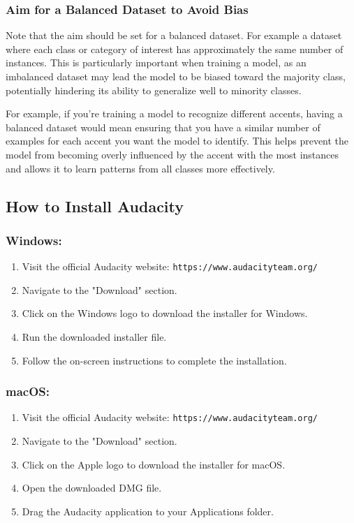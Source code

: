\subsubsection{Aim for a Balanced Dataset to Avoid Bias}

Note that the aim should be set for a balanced dataset. For example a dataset where each class or category of interest has approximately the same number of instances. This is particularly important when training a model, as an imbalanced dataset may lead the model to be biased toward the majority class, potentially hindering its ability to generalize well to minority classes.

For example, if you're training a model to recognize different accents, having a balanced dataset would mean ensuring that you have a similar number of examples for each accent you want the model to identify. This helps prevent the model from becoming overly influenced by the accent with the most instances and allows it to learn patterns from all classes more effectively.


\subsection{How to Install Audacity}

\subsubsection{Windows:}

\begin{enumerate}
	\item Visit the official Audacity website: \texttt{https://www.audacityteam.org/}
	\item Navigate to the "Download" section.
	\item Click on the Windows logo to download the installer for Windows.
	\item Run the downloaded installer file.
	\item Follow the on-screen instructions to complete the installation.
\end{enumerate}

\subsubsection{macOS:}

\begin{enumerate}
	\item Visit the official Audacity website: \texttt{https://www.audacityteam.org/}
	\item Navigate to the "Download" section.
	\item Click on the Apple logo to download the installer for macOS.
	\item Open the downloaded DMG file.
	\item Drag the Audacity application to your Applications folder.
\end{enumerate}

